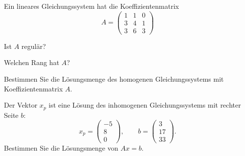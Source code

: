 Ein lineares Gleichungssystem hat die Koeffizientenmatrix
\[
A=\begin{pmatrix}
1&1&0\\
3&4&1\\
3&6&3
\end{pmatrix}
\]
\begin{teilaufgaben}
\item Ist $A$ regulär?
\item Welchen Rang hat $A$?
\item Bestimmen Sie die Lösungsmenge des homogenen Gleichungssystems mit
Koeffizientenmatrix $A$.
\item Der Vektor $x_p$ ist eine Lösung des inhomogenen Gleichungssystems mit
rechter Seite $b$:
\[
x_p=
\begin{pmatrix}
-5\\8\\0
\end{pmatrix}
,\qquad
b=\begin{pmatrix}
3\\17\\33
\end{pmatrix}.
\]
Bestimmen Sie die Lösungsmenge von $Ax=b$.
\end{teilaufgaben}

